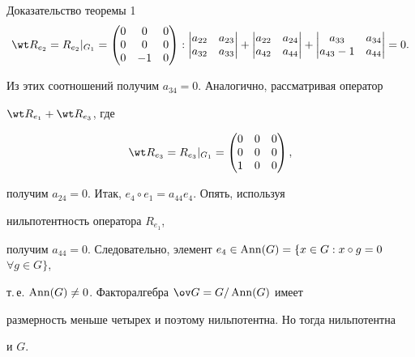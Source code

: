 \begin{pf*}{Доказательство теоремы 1}
$$ 


\wt R_{e_2}=R_{e_2}|_{G_1}= 


\begin{pmatrix} 


0 & 0 & 0 \\ 0 & 0 & 0 \\ 0 & -1 & 0 


\end{pmatrix} 


: 


\begin{vmatrix} 


a_{22} & a_{23} \\ a_{32} & a_{33} 


\end{vmatrix} 


+ 


\begin{vmatrix} 


a_{22} & a_{24} \\ a_{42} & a_{44} 


\end{vmatrix} 


+ 


\begin{vmatrix} 


a_{33} & a_{34} \\ a_{43}-1 & a_{44} 


\end{vmatrix} 


=0.


$$ 


Из этих соотношений получим $a_{34}=0$. Аналогично, рассматривая оператор 


$\wt R_{e_1}+\wt R_{e_3}$, где 


$$ 


\wt R_{e_3}=R_{e_3}|_{G_1}= 


\begin{pmatrix} 


0 & 0 & 0 \\ 0 & 0 & 0 \\ 1 & 0 & 0 


\end{pmatrix} 


,


$$ 


получим $a_{24}=0$. Итак, $e_4\circ e_1=a_{44}e_4$. Опять, используя 


нильпотентность оператора $R_{e_1}$, 


получим $a_{44}=0$. Следовательно, элемент $e_4\in\Ann(G)=\{x\in G: 


x\circ g=0$ $\forall g\in G\}$, 


т.\,е. $\operatorname{Ann}(G)\ne0$. Факторалгебра $\ov G=G/\Ann(G)$ имеет 


размерность меньше четырех и поэтому нильпотентна. Но тогда нильпотентна 


и $G$. 


\end{pf*} 


